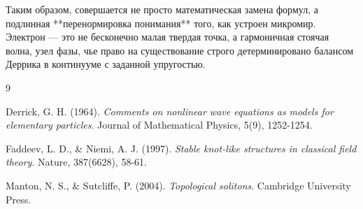 \documentclass[12pt,a4paper]{article}
\begin{document}
Таким образом, совершается не просто математическая замена формул, а подлинная **перенормировка понимания** того, как устроен микромир. Электрон — это не бесконечно малая твердая точка, а гармоничная стоячая волна, узел фазы, чье право на существование строго детерминировано балансом Деррика в континууме с заданной упругостью.

\begin{thebibliography}{9}

Derrick, G. H. (1964). \textit{Comments on nonlinear wave equations as models for elementary particles}. Journal of Mathematical Physics, 5(9), 1252-1254.

Faddeev, L. D., \& Niemi, A. J. (1997). \textit{Stable knot-like structures in classical field theory}. Nature, 387(6628), 58-61.

Manton, N. S., \& Sutcliffe, P. (2004). \textit{Topological solitons}. Cambridge University Press.

\end{thebibliography}
\end{document}
